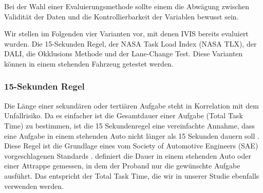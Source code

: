 Bei der Wahl einer Evaluierungsmethode sollte einem die Abwägung zwischen Validität der Daten und die Kontrollierbarkeit der Variablen bewusst sein.

Wir stellen im Folgenden vier Varianten vor, mit denen IVIS bereits evaluiert wurden. Die 15-Sekunden Regel, der NASA Task Load Index (NASA TLX), der DALI, die Okklusions Methode und der Lane-Change Test. 
Diese Varianten können in einem stehenden Fahrzeug getestet werden. 
\subsubsection{15-Sekunden Regel}
Die Länge einer sekundären oder tertiären Aufgabe steht in Korrelation mit dem Unfallrisiko. Da es einfacher ist die Gesamtdauer einer Aufgabe (Total Task Time) zu bestimmen, ist die 15 Sekundenregel eine vereinfachte Annahme, dass eine Aufgabe in einem stehenden Auto nicht länger als 15 Sekunden dauern soll \citet{green199915}. 
Diese Regel ist die Grundlage eines vom Society of Automotive Engineers (SAE) vorgeschlagenen Standards \citet{green1999sae}. 
\citet{green1999sae} definiert die Dauer in einem stehenden Auto oder einer Attrappe gemessen, in dem der Proband nur die gewünschte Aufgabe ausführt. 
Das entspricht der Total Task Time, die wir in unserer Studie ebenfalls verwenden werden.
